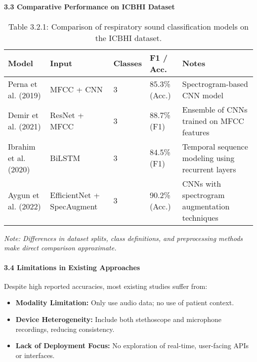 \paragraph{3.3 Comparative Performance on ICBHI Dataset\\}
\begin{table}[h!]
\centering
\small
\renewcommand{\arraystretch}{1.2}
\begin{tabular}{|p{3.2cm}|p{2.2cm}|p{1.5cm}|p{2.2cm}|p{4cm}|}
\hline
\textbf{Model} & \textbf{Input} & \textbf{Classes} & \textbf{F1 / Acc.} & \textbf{Notes} \\
\hline
Perna et al. (2019) \cite{perna2019} & MFCC + CNN & 3 & 85.3\% (Acc.) & Spectrogram-based CNN model \\
Demir et al. (2021) \cite{demir2021} & ResNet + MFCC & 3 & 88.7\% (F1) & Ensemble of CNNs trained on MFCC features \\
Ibrahim et al. (2020) \cite{ibrahim2020} & BiLSTM & 3 & 84.5\% (F1) & Temporal sequence modeling using recurrent layers \\
Aygun et al. (2022) \cite{aygun2022} & EfficientNet + SpecAugment & 3 & 90.2\% (Acc.) & CNNs with spectrogram augmentation techniques \\
\hline
\end{tabular}
\caption*{Table 3.2.1: Comparison of respiratory sound classification models on the ICBHI dataset.}
\label{tab:icbhi_comparison}
\end{table}
\vspace{0.5em}
\textit{Note: Differences in dataset splits, class definitions, and preprocessing methods make direct comparison approximate.}

\paragraph{3.4 Limitations in Existing Approaches\\}
Despite high reported accuracies, most existing studies suffer from:
\begin{itemize}
    \item \textbf{Modality Limitation:} Only use audio data; no use of patient context.
    \item \textbf{Device Heterogeneity:} Include both stethoscope and microphone recordings, reducing consistency.
    \item \textbf{Lack of Deployment Focus:} No exploration of real-time, user-facing APIs or interfaces.
\end{itemize}

